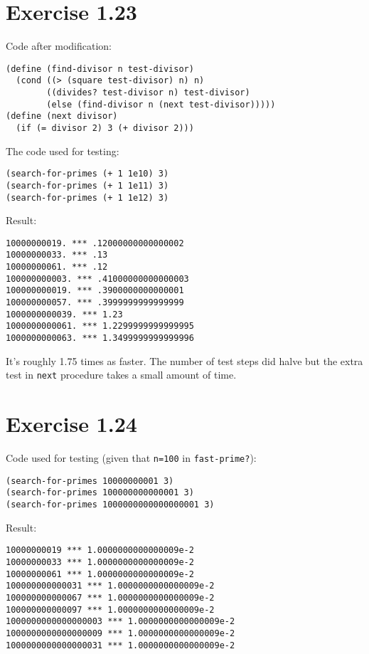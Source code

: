 \documentclass[../main.tex]{subfiles}
\begin{document}
\section{Exercise 1.23}

Code after modification:

\begin{lstlisting}
(define (find-divisor n test-divisor)
  (cond ((> (square test-divisor) n) n)
        ((divides? test-divisor n) test-divisor)
        (else (find-divisor n (next test-divisor)))))
(define (next divisor)
  (if (= divisor 2) 3 (+ divisor 2)))
\end{lstlisting}

The code used for testing:

\begin{lstlisting}
(search-for-primes (+ 1 1e10) 3)
(search-for-primes (+ 1 1e11) 3)
(search-for-primes (+ 1 1e12) 3)
\end{lstlisting}

Result:

\begin{lstlisting}
10000000019. *** .12000000000000002
10000000033. *** .13
10000000061. *** .12
100000000003. *** .41000000000000003
100000000019. *** .3900000000000001
100000000057. *** .3999999999999999
1000000000039. *** 1.23
1000000000061. *** 1.2299999999999995
1000000000063. *** 1.3499999999999996
\end{lstlisting}

It's roughly 1.75 times as faster. The number of test steps
 did halve but the extra test in \lstinline{next} procedure
 takes a small amount of time.

\section{Exercise 1.24}

Code used for testing (given that \lstinline{n=100} in \lstinline{fast-prime?}):

\begin{lstlisting}
(search-for-primes 10000000001 3)
(search-for-primes 100000000000001 3)
(search-for-primes 1000000000000000001 3)
\end{lstlisting}

Result:

\begin{lstlisting}
10000000019 *** 1.0000000000000009e-2
10000000033 *** 1.0000000000000009e-2
10000000061 *** 1.0000000000000009e-2
100000000000031 *** 1.0000000000000009e-2
100000000000067 *** 1.0000000000000009e-2
100000000000097 *** 1.0000000000000009e-2
1000000000000000003 *** 1.0000000000000009e-2
1000000000000000009 *** 1.0000000000000009e-2
1000000000000000031 *** 1.0000000000000009e-2
\end{lstlisting}
\end{document}
